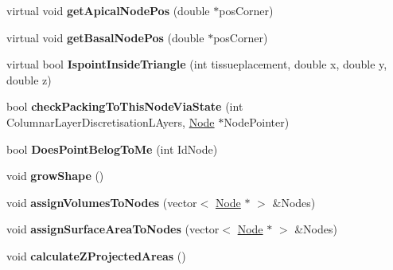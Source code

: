 \begin{DoxyCompactItemize}
\item 
\hypertarget{classShapeBase_a8e70b4b3be96de765028face345ad73d}{}virtual void {\bfseries get\+Apical\+Node\+Pos} (double $\ast$pos\+Corner)\label{classShapeBase_a8e70b4b3be96de765028face345ad73d}

\item 
\hypertarget{classShapeBase_a5a6237d792984062e576ecdb87e9c75e}{}virtual void {\bfseries get\+Basal\+Node\+Pos} (double $\ast$pos\+Corner)\label{classShapeBase_a5a6237d792984062e576ecdb87e9c75e}

\item 
\hypertarget{classShapeBase_a0afba3fd829971174cd736b45722758c}{}virtual bool {\bfseries Ispoint\+Inside\+Triangle} (int tissueplacement, double x, double y, double z)\label{classShapeBase_a0afba3fd829971174cd736b45722758c}

\item 
\hypertarget{classShapeBase_a4d7bfb4ed03b7633e02e753a485fbf01}{}bool {\bfseries check\+Packing\+To\+This\+Node\+Via\+State} (int Columnar\+Layer\+Discretisation\+L\+Ayers, \hyperlink{classNode}{Node} $\ast$Node\+Pointer)\label{classShapeBase_a4d7bfb4ed03b7633e02e753a485fbf01}

\item 
\hypertarget{classShapeBase_aed4c893952a6afad718a2037e0635296}{}bool {\bfseries Does\+Point\+Belog\+To\+Me} (int Id\+Node)\label{classShapeBase_aed4c893952a6afad718a2037e0635296}

\item 
\hypertarget{classShapeBase_a92ec10be4c8ba3dd3e4b95ccd08bba7b}{}void {\bfseries grow\+Shape} ()\label{classShapeBase_a92ec10be4c8ba3dd3e4b95ccd08bba7b}

\item 
\hypertarget{classShapeBase_acee26103666067517d905b32edfbf302}{}void {\bfseries assign\+Volumes\+To\+Nodes} (vector$<$ \hyperlink{classNode}{Node} $\ast$ $>$ \&Nodes)\label{classShapeBase_acee26103666067517d905b32edfbf302}

\item 
\hypertarget{classShapeBase_a83be371f8675d04050d038e7fe1e98d5}{}void {\bfseries assign\+Surface\+Area\+To\+Nodes} (vector$<$ \hyperlink{classNode}{Node} $\ast$ $>$ \&Nodes)\label{classShapeBase_a83be371f8675d04050d038e7fe1e98d5}

\item 
\hypertarget{classShapeBase_a4bc9c0bb828f73c105321fd5a25be8cc}{}void {\bfseries calculate\+Z\+Projected\+Areas} ()\label{classShapeBase_a4bc9c0bb828f73c105321fd5a25be8cc}


\end{DoxyCompactItemize}
